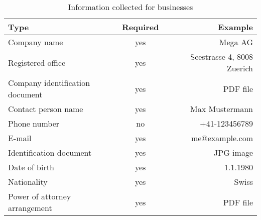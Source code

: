 \begin{table}
  \caption{Information collected for businesses}
  \label{table:proc:kyc:business}
  \begin{center}
    \begin{tabular}{l|c|r}
      {\bf Type}                      & {\bf Required} & {\bf Example}        \\ \hline \hline
      Company name                    & yes        & Mega AG \\
      Registered office               & yes        & Seestrasse 4, 8008 Zuerich \\
      Company identification document & yes        & PDF file \\ \hline
      Contact person name             & yes        & Max Mustermann \\
      Phone number                    & no         & +41-123456789  \\
      E-mail                          & yes        & me@example.com \\
      Identification document         & yes        & JPG image \\
      Date of birth                   & yes        & 1.1.1980  \\
      Nationality                     & yes        & Swiss     \\ \hline
      Power of attorney arrangement   & yes        & PDF file  \\
  \end{tabular}
  \end{center}
\end{table}
